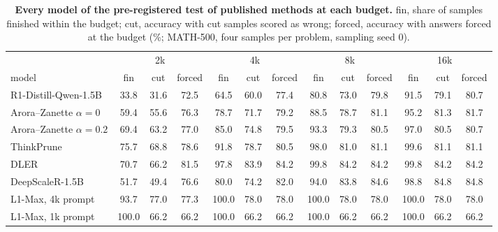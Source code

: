 \documentclass[10pt]{article}
\begin{document}
\begin{table}[h]
\centering\footnotesize
\caption{\textbf{Every model of the pre-registered test of published methods at each budget.} fin, share of samples finished within the budget; cut, accuracy with cut samples scored as wrong; forced, accuracy with answers forced at the budget (\%; MATH-500, four samples per problem, sampling seed 0).}
\label{tab:extarms}
\setlength{\tabcolsep}{3pt}
\begin{tabular}{lcccccccccccc}
\toprule
 & \multicolumn{3}{c}{2k} & \multicolumn{3}{c}{4k} & \multicolumn{3}{c}{8k} & \multicolumn{3}{c}{16k} \\
\cmidrule(lr){2-4}\cmidrule(lr){5-7}\cmidrule(lr){8-10}\cmidrule(lr){11-13}
model & fin & cut & forced & fin & cut & forced & fin & cut & forced & fin & cut & forced \\
\midrule
R1-Distill-Qwen-1.5B & 33.8 & 31.6 & 72.5 & 64.5 & 60.0 & 77.4 & 80.8 & 73.0 & 79.8 & 91.5 & 79.1 & 80.7 \\
Arora--Zanette $\alpha{=}0$ & 59.4 & 55.6 & 76.3 & 78.7 & 71.7 & 79.2 & 88.5 & 78.7 & 81.1 & 95.2 & 81.3 & 81.7 \\
Arora--Zanette $\alpha{=}0.2$ & 69.4 & 63.2 & 77.0 & 85.0 & 74.8 & 79.5 & 93.3 & 79.3 & 80.5 & 97.0 & 80.5 & 80.7 \\
ThinkPrune & 75.7 & 68.8 & 78.6 & 91.8 & 78.7 & 80.5 & 98.0 & 81.0 & 81.1 & 99.6 & 81.1 & 81.1 \\
DLER & 70.7 & 66.2 & 81.5 & 97.8 & 83.9 & 84.2 & 99.8 & 84.2 & 84.2 & 99.8 & 84.2 & 84.2 \\
DeepScaleR-1.5B & 51.7 & 49.4 & 76.6 & 80.0 & 74.2 & 82.0 & 94.0 & 83.8 & 84.6 & 98.8 & 84.8 & 84.8 \\
L1-Max, 4k prompt & 93.7 & 77.0 & 77.3 & 100.0 & 78.0 & 78.0 & 100.0 & 78.0 & 78.0 & 100.0 & 78.0 & 78.0 \\
L1-Max, 1k prompt & 100.0 & 66.2 & 66.2 & 100.0 & 66.2 & 66.2 & 100.0 & 66.2 & 66.2 & 100.0 & 66.2 & 66.2 \\
\bottomrule
\end{tabular}
\end{table}
\end{document}
